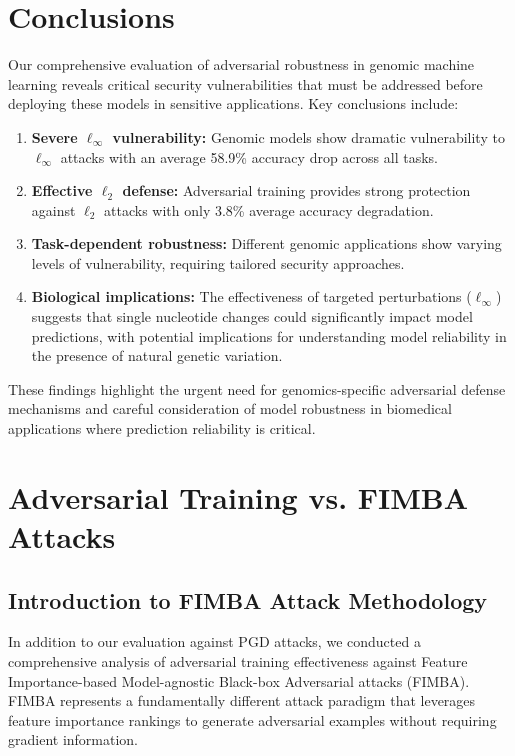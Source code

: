 \documentclass{article} %
\begin{document}
\section{Conclusions}

Our comprehensive evaluation of adversarial robustness in genomic machine learning reveals critical security vulnerabilities that must be addressed before deploying these models in sensitive applications. Key conclusions include:

\begin{enumerate}
    \item \textbf{Severe $\ell_\infty$ vulnerability:} Genomic models show dramatic vulnerability to $\ell_\infty$ attacks with an average 58.9\% accuracy drop across all tasks.
    
    \item \textbf{Effective $\ell_2$ defense:} Adversarial training provides strong protection against $\ell_2$ attacks with only 3.8\% average accuracy degradation.
    
    \item \textbf{Task-dependent robustness:} Different genomic applications show varying levels of vulnerability, requiring tailored security approaches.
    
    \item \textbf{Biological implications:} The effectiveness of targeted perturbations ($\ell_\infty$) suggests that single nucleotide changes could significantly impact model predictions, with potential implications for understanding model reliability in the presence of natural genetic variation.
\end{enumerate}

These findings highlight the urgent need for genomics-specific adversarial defense mechanisms and careful consideration of model robustness in biomedical applications where prediction reliability is critical.

\section{Adversarial Training vs. FIMBA Attacks}

\subsection{Introduction to FIMBA Attack Methodology}

In addition to our evaluation against PGD attacks, we conducted a comprehensive analysis of adversarial training effectiveness against Feature Importance-based Model-agnostic Black-box Adversarial attacks (FIMBA). FIMBA represents a fundamentally different attack paradigm that leverages feature importance rankings to generate adversarial examples without requiring gradient information.
\end{document}
